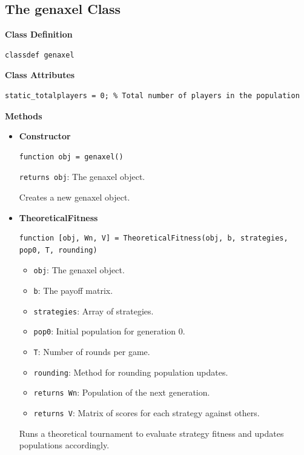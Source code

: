 \documentclass[12pt]{report}
\begin{document}
\subsection{The genaxel Class}

\textbf{Class Definition}
\begin{verbatim}
classdef genaxel
\end{verbatim}

\bigskip

\textbf{Class Attributes}
\begin{verbatim}
static_totalplayers = 0; % Total number of players in the population
\end{verbatim}

\bigskip

\textbf{Methods}
\begin{itemize}

  \item \textbf{Constructor}
  \begin{verbatim}
function obj = genaxel()
  \end{verbatim}
  \texttt{returns obj}: The genaxel object.

  Creates a new genaxel object.

  \item \textbf{TheoreticalFitness}
  \begin{verbatim}
function [obj, Wn, V] = TheoreticalFitness(obj, b, strategies, pop0, T, rounding)
  \end{verbatim}
  \begin{itemize}
    \item \texttt{obj}: The genaxel object.
    \item \texttt{b}: The payoff matrix.
    \item \texttt{strategies}: Array of strategies.
    \item \texttt{pop0}: Initial population for generation 0.
    \item \texttt{T}: Number of rounds per game.
    \item \texttt{rounding}: Method for rounding population updates.
    \item \texttt{returns Wn}: Population of the next generation.
    \item \texttt{returns V}: Matrix of scores for each strategy against others.
  \end{itemize}
  Runs a theoretical tournament to evaluate strategy fitness and updates populations accordingly.


\end{itemize}
\end{document}
